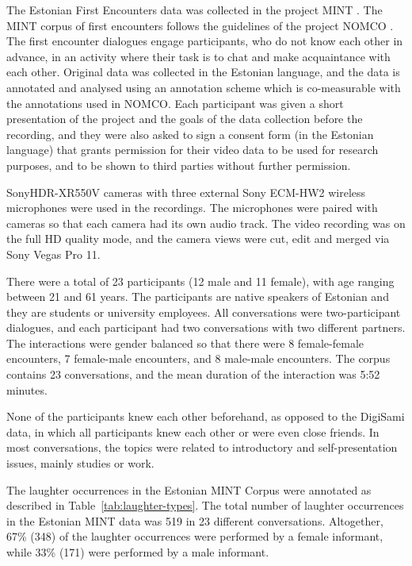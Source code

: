 \documentclass[10pt,journal,compsoc]{IEEEtran}
\begin{document}
The Estonian First Encounters data was collected in the project MINT \cite{Jokinen:Tenjes:12}. The MINT corpus of first encounters follows the guidelines of the project NOMCO \cite{Paggio:ea:10}. The first encounter dialogues engage participants, who do not know each other in advance, in an activity where their task is to chat and make acquaintance with each other. Original data was collected in the Estonian language, and the data is annotated and analysed using an annotation scheme which is co-measurable with the annotations used in NOMCO. Each participant was given a short presentation of the project and the goals of the data collection before the recording, and they were also asked to sign a consent form (in the Estonian language) that grants permission for their video data to be used for research purposes, and to be shown to third parties without further permission.

SonyHDR-XR550V cameras with three external Sony ECM-HW2 wireless microphones were used in the recordings. The microphones were paired with cameras so that each camera had its own audio track. The video recording was on the full HD quality mode, and the camera views were cut, edit and merged via Sony Vegas Pro 11.

There were a total of 23 participants (12 male and 11 female), with age ranging between 21 and 61 years. The participants are native speakers of Estonian and they are students or university employees. All conversations were two-participant dialogues, and each participant had two conversations with two different partners. The interactions were gender balanced so that there were 8 female-female encounters, 7 female-male encounters, and 8 male-male encounters. The corpus contains 23 conversations, and the mean duration of the interaction was 5:52 minutes.

None of the participants knew each other beforehand, as opposed to the DigiSami data, in which all participants knew each other or were even close friends. In most conversations, the topics were related to introductory and self-presentation issues, mainly studies or work.

The laughter occurrences in the Estonian MINT Corpus were annotated as described in Table~\ref{tab:laughter-types}. The total number of laughter occurrences in the Estonian MINT data was 519 in 23 different conversations.
Altogether, 67\% (348) of the laughter occurrences were performed by a female informant, while 33\% (171) were performed by a male informant.
\end{document}

